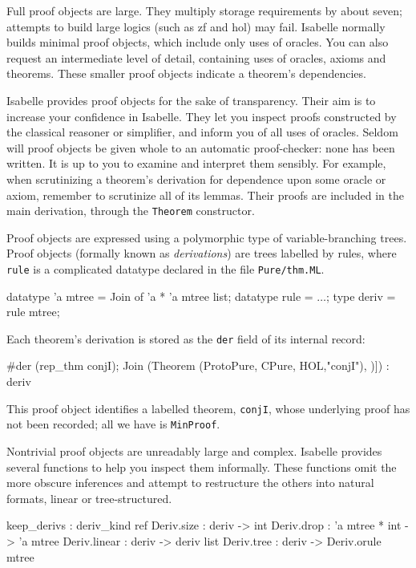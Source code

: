 Full proof objects are large.  They multiply storage requirements by about
seven; attempts to build large logics (such as {\sc zf} and {\sc hol}) may
fail.  Isabelle normally builds minimal proof objects, which include only uses
of oracles.  You can also request an intermediate level of detail, containing
uses of oracles, axioms and theorems.  These smaller proof objects indicate a
theorem's dependencies.

Isabelle provides proof objects for the sake of transparency.  Their aim is to
increase your confidence in Isabelle.  They let you inspect proofs constructed
by the classical reasoner or simplifier, and inform you of all uses of
oracles.  Seldom will proof objects be given whole to an automatic
proof-checker: none has been written.  It is up to you to examine and
interpret them sensibly.  For example, when scrutinizing a theorem's
derivation for dependence upon some oracle or axiom, remember to scrutinize
all of its lemmas.  Their proofs are included in the main derivation, through
the {\tt Theorem} constructor.

Proof objects are expressed using a polymorphic type of variable-branching
trees.  Proof objects (formally known as {\em derivations\/}) are trees
labelled by rules, where {\tt rule} is a complicated datatype declared in the
file {\tt Pure/thm.ML}.
\begin{ttbox} 
datatype 'a mtree = Join of 'a * 'a mtree list;
datatype rule     = \(\ldots\);
type deriv        = rule mtree;
\end{ttbox}
%
Each theorem's derivation is stored as the {\tt der} field of its internal
record: 
\begin{ttbox} 
#der (rep_thm conjI);
{\out Join (Theorem ({ProtoPure, CPure, HOL},"conjI"),}
{\out       [Join (MinProof,[])]) : deriv}
\end{ttbox}
This proof object identifies a labelled theorem, {\tt conjI}, whose underlying
proof has not been recorded; all we have is {\tt MinProof}.

Nontrivial proof objects are unreadably large and complex.  Isabelle provides
several functions to help you inspect them informally.  These functions omit
the more obscure inferences and attempt to restructure the others into natural
formats, linear or tree-structured.

\begin{ttbox} 
keep_derivs  : deriv_kind ref
Deriv.size   : deriv -> int
Deriv.drop   : 'a mtree * int -> 'a mtree
Deriv.linear : deriv -> deriv list
Deriv.tree   : deriv -> Deriv.orule mtree
\end{ttbox}

